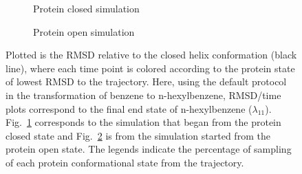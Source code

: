 \documentclass[T4paper.tex]{subfiles}
\begin{document}
\begin{figure}[!h]
\begin{subfigure}{\textwidth}
   \centering
    \caption{Protein closed simulation}
   \label{fig:c_opls3_1/RMSD-replica11}
\end{subfigure}
\centering
\begin{subfigure}{\textwidth}
  \centering
  \caption{Protein open simulation}
  \label{fig:o_opls3_1/RMSD-replica11}
\end{subfigure}%
\caption{Plotted is the RMSD relative to the closed helix conformation (black line), where each time point is colored according to the protein state of lowest RMSD to the trajectory. Here, using the default protocol in the transformation of benzene to n-hexylbenzene, RMSD/time plots correspond to the final end state of n-hexylbenzene ($\lambda_{11}$). Fig.~\ref{fig:c_opls3_1/RMSD-replica11} corresponds to the simulation that began from the protein closed state and Fig.~\ref{fig:o_opls3_1/RMSD-replica11} is from the simulation started from the protein open state. The legends indicate the percentage of sampling of each protein conformational state from the trajectory.}
\label{fig:benzene_to_n-hexyl}
\end{figure}
\end{document}
